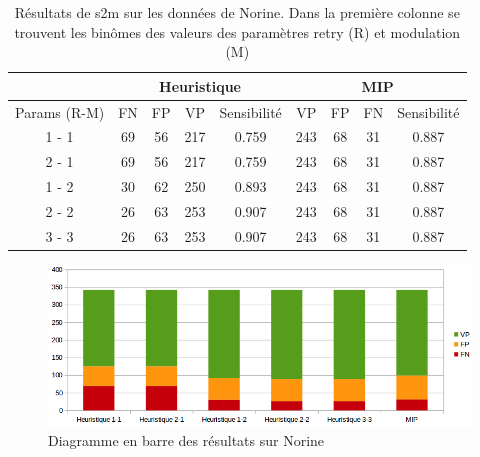 \begin{table}[!ht]
  \centering
  \begin{tabular}{|c|c|c|c|c|c|c|c|c|}
    \hline
    & \multicolumn{4}{c|}{Heuristique} & \multicolumn{4}{c|}{MIP} \\
    \hline
    Params (R-M) & FN & FP & VP & Sensibilité & VP & FP & FN & Sensibilité \\
    \hline
    1 - 1 & 69 & 56 & 217 & 0.759 & 243 & 68 & 31 & 0.887 \\
    \hline
    2 - 1 & 69 & 56 & 217 & 0.759 & 243 & 68 & 31 & 0.887 \\
    \hline
    1 - 2 & 30 & 62 & 250 & 0.893 & 243 & 68 & 31 & 0.887 \\
    \hline
    2 - 2 & 26 & 63 & 253 & 0.907 & 243 & 68 & 31 & 0.887 \\
    \hline
    3 - 3 & 26 & 63 & 253 & 0.907 & 243 & 68 & 31 & 0.887 \\
    \hline
  \end{tabular}
  \caption{\label{nor_results}Résultats de s2m sur les données de Norine.
  Dans la première colonne se trouvent les binômes des valeurs des paramètres retry (R) et modulation (M)}
\end{table}

\begin{figure}[!ht]
  \begin{center}
    \includegraphics[width=450px]{Figures/s2m/results/Norine.png}
    \caption{\label{nor_graph}Diagramme en barre des résultats sur Norine}
  \end{center}
\end{figure}

